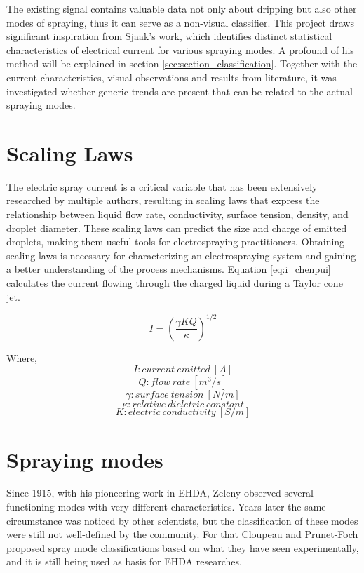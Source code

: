   The existing signal contains valuable data not only about dripping but also other modes of spraying, thus it can serve as a non-visual classifier.
  This project draws significant inspiration from Sjaak's\cite{Sjaaks} work, which identifies distinct statistical characteristics of electrical current for various spraying modes.
  A profound of his method will be explained in section \ref{sec:section_classification}.
  Together with the current characteristics, visual observations and results from literature, it was investigated whether generic trends are present that can be related to the actual spraying modes.


\section{Scaling Laws}
\label{sec:scalling-laws}

The electric spray current is a critical variable that has been extensively researched by multiple authors\cite{prunet}\cite{Chen_Pui}\cite{gananCalvo}, resulting in scaling laws that express the relationship between liquid flow rate, conductivity, surface tension, density, and droplet diameter. 
These scaling laws can predict the size and charge of emitted droplets, making them useful tools for electrospraying practitioners. 
Obtaining scaling laws is necessary for characterizing an electrospraying system and gaining a better understanding of the process mechanisms. 
Equation \ref{eq:i_chenpui} calculates the current flowing through the charged liquid during a Taylor\cite{taylor} cone jet.

\begin{equation}\label{eq:i_chenpui}
	I = (\frac{\gamma K Q}{\kappa})^{1/2}
\end{equation}

Where,
\[I : current \: emitted \: [A] \] 
\[Q : flow \: rate \: [m^3/s] \]    
\[ \gamma : surface \: tension \: [N/m]  \]   
\[\kappa : relative \: dieletric \: constant \] 
\[K : electric \: conductivity \: [S/m] \] 


\section{Spraying modes}
\label{sec:spraying_modes_subsec}

Since 1915, with his pioneering work in EHDA, Zeleny\cite{zeleny14} observed several functioning modes with very different characteristics.
Years later the same circumstance was noticed by other scientists, but the classification of these modes were still not well-defined by the community.
For that Cloupeau and Prunet-Foch\cite{prunet} proposed spray mode classifications based on what they have seen experimentally, and it is still being used as basis for EHDA researches.

